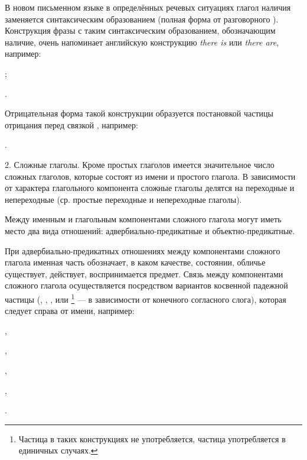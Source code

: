 В новом письменном языке в определённых речевых ситуациях глагол наличия  заменяется синтаксическим образованием  (полная форма от разговорного ). Конструкция фразы с таким синтаксическим образованием, обозначающим наличие, очень напоминает английскую конструкцию \emph{there is} или \emph{there are}, например:
\begin{prfsample}
	\item {};
	\item {}.
\end{prfsample}
Отрицательная форма такой конструкции образуется постановкой частицы отрицания перед связкой , например:
\begin{prfsample}
	\item {}.
\end{prfsample}

2. Сложные глаголы. Кроме простых глаголов имеется значительное число сложных глаголов, которые состоят из имени и простого глагола. В зависимости от характера глагольного компонента сложные глаголы делятся на переходные и непереходные (ср. простые переходные и непереходные глаголы).

Между именным и глагольным ком\-по\-нен\-та\-ми сложного глагола могут иметь место два вида отношений: адвер\-би\-аль\-но-пре\-ди\-кат\-ные и объект\-но-пре\-ди\-кат\-ные.

При адвербиально-предикатных отношениях между компонентами сложного глагола именная часть обозначает, в каком качестве, состоянии, обличье существует, действует, воспринимается предмет. Связь между компонентами сложного глагола осуществляется посредством вариантов косвенной падежной частицы (, , ,  или \footnote[35]{Частица  в таких конструкциях не употребляется, частица  употребляется в единичных случаях.} --- в зависимости от конечного согласного слога), которая следует справа от имени, например:
\begin{prfsample}
	\item {},
	\item {},
	\item {},
	\item {},
	\item {}.
\end{prfsample}

